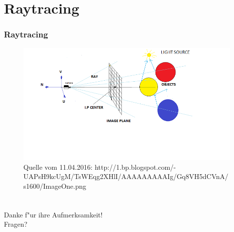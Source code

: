 \documentclass[12pt,german]{beamer}
\begin{document}

\section{Raytracing}

\begin{frame}
\frametitle{Raytracing}	
  \begin{figure}
    \includegraphics{ray}
    \caption{Quelle vom 11.04.2016: http://1.bp.blogspot.com/-UAPsH9kcUgM/TsWEqg2XHlI/AAAAAAAAAIg/Gq8VH5dCVnA/s1600/ImageOne.png}
  \end{figure}
\end{frame}

\section*{}

\begin{frame}
  \begin{center}
    Danke f"ur ihre Aufmerksamkeit! \\
    Fragen?
  \end{center}
\end{frame}
\end{document}
